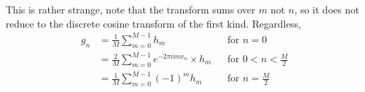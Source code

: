 \documentclass[11pt]{article}
\begin{document}
This is rather strange, note that the transform sums over $m$ not $n$, so it does not reduce to the discrete cosine transform of the first kind. Regardless, 
\begin{align}
   g_n &= \frac{1}{M} \sum_{m=0}^{M-1} h_m                      &&\text{for } n = 0 \\
   &= \frac{2}{M} \sum_{m=0}^{M-1} e^{-2\pi i m w_n} \times h_m &&\text{for } 0 < n < \frac{M}{2} \\
   &= \frac{1}{M} \sum_{m=0}^{M-1} (-1)^m h_m                   &&\text{for } n = \frac{M}{2}
\end{align}
\end{document}

